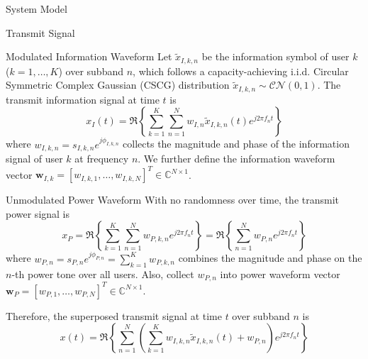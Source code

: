\documentclass{IEEEtran}
\begin{document}
\begin{section}{System Model}
	\begin{subsection}{Transmit Signal}
		\begin{subsubsection} {Modulated Information Waveform}
			Let $\tilde{x}_{I,k,n}$ be the information symbol of user $k$ ($k=1,\dots,K$) over subband $n$, which follows a capacity-achieving i.i.d. Circular Symmetric Complex Gaussian (CSCG) distribution $\tilde{x}_{I,k,n}\sim\mathcal{CN}(0,1)$. The transmit information signal at time $t$ is
			\begin{equation}\label{eq:x_I}
				x_{I}(t)=\Re\left\{\sum_{k=1}^K\sum_{n=1}^N{w_{I,n}\tilde{x}_{I,k,n}(t)}{e^{j2{\pi}{f_n}{t}}}\right\}
			\end{equation}
			where $w_{I,k,n}=s_{I,k,n}e^{j\phi_{I,k,n}}$ collects the magnitude and phase of the information signal of user $k$ at frequency $n$. We further define the information waveform vector $\boldsymbol{w}_{I,k}=[w_{I,k,1},\dots,w_{I,k,N}]^T \in \mathbb{C}^{N{\times}1}$.
		\end{subsubsection}

		\begin{subsubsection}{Unmodulated Power Waveform}
			With no randomness over time, the transmit power signal is
			\begin{equation}\label{eq:x_P}
				x_{P}=\Re\left\{\sum_{k=1}^K\sum_{n=1}^N{w_{P,k,n}}{e^{j2{\pi}{f_n}{t}}}\right\}=\Re\left\{\sum_{n=1}^N{w_{P,n}}{e^{j2{\pi}{f_n}{t}}}\right\}
			\end{equation}
			where $w_{P,n}=s_{P,n}e^{j\phi_{P,n}}=\sum_{k=1}^K{w_{P,k,n}}$ combines the magnitude and phase on the $n$-th power tone over all users. Also, collect $w_{P,n}$ into power waveform vector $\boldsymbol{w}_P=[w_{P,1},\dots,w_{P,N}]^T \in \mathbb{C}^{N{\times}1}$.
		\end{subsubsection}

		Therefore, the superposed transmit signal at time $t$ over subband $n$ is
		\begin{equation}\label{eq:x}
			x(t)=\Re\left\{\sum_{n=1}^N\left(\sum_{k=1}^K{w_{I,k,n}\tilde{x}_{I,k,n}(t)}+w_{P,n}\right){e^{j2{\pi}{f_n}{t}}}\right\}
		\end{equation}

	\end{subsection}


\end{section}
\end{document}
